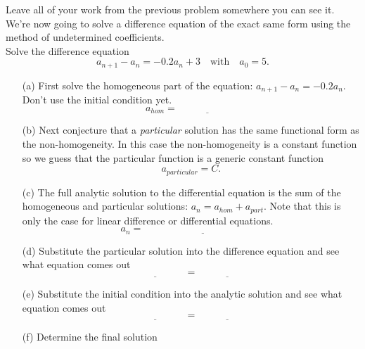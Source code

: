 \begin{problem}
    Leave all of your work from the previous problem somewhere you can see it.  We're now
    going to solve a difference equation of the exact same form using the method of
    undetermined coefficients. \\
    Solve the difference equation
    \[ a_{n+1} - a_n = -0.2 a_n + 3 \quad \text{with} \quad a_0 = 5. \]
    \begin{enumerate}
        \item[(a)] First solve the homogeneous part of the equation: $a_{n+1} - a_n = -0.2
            a_n$. Don't use the initial condition yet. 
            \[ a_{hom} = \underline{\hspace{1in}} \]
            \solution{
                \[ a_{hom} = C (1-0.2)^n. \]
            }
        \item[(b)] Next conjecture that a {\it particular} solution has the same functional
            form as the non-homogeneity.  In this case the non-homogeneity is a constant
            function so we guess that the particular function is a generic constant
            function
            \[ a_{particular} = C. \]
        \item[(c)] The full analytic solution to the differential equation is the sum of the
            homogeneous and particular solutions: $a_n = a_{hom} + a_{part}$.  Note
            that this is only the case for linear difference or differential equations.
            \[ a_n = \underline{\hspace{2in}} \]
        \item[(d)] Substitute the particular solution into the difference equation and see
            what equation comes out
            \[ \underline{\hspace{1in}} = \underline{\hspace{1in}} \]
        \item[(e)] Substitute the initial condition into the analytic solution and see what
            equation comes out
            \[ \underline{\hspace{1in}} = \underline{\hspace{1in}} \]
        \item[(f)] Determine the final solution
    \end{enumerate}
\end{problem}

